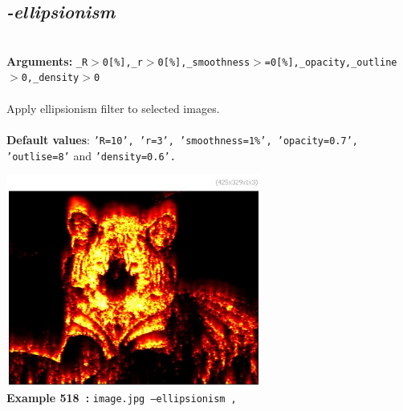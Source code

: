 \documentclass[a4paper,11pt,twoside]{book}
\begin{document}
\subsection{\emph{-ellipsionism} }\vspace*{-0.5em}
~\\\textbf{Arguments: } 
{\small \texttt{\_R$>$0[\%],\_r$>$0[\%],\_smoothness$>$=0[\%],\_opacity,\_outline$>$0,\_density$>$0}}\\~\\
Apply ellipsionism filter to selected images.
~\\~\\\textbf{Default values}: {\small \texttt{'R=10', 'r=3', 'smoothness=1\%', 'opacity=0.7', 'outlise=8'} and \texttt{'density=0.6'.}}
\begin{center}\includegraphics[keepaspectratio=true,height=7cm,width=\textwidth]{img/gmic_def518.jpg}\\
{\footnotesize \textbf{Example 518~:} \texttt{image.jpg --ellipsionism ,}}
\end{center}
\end{document}
